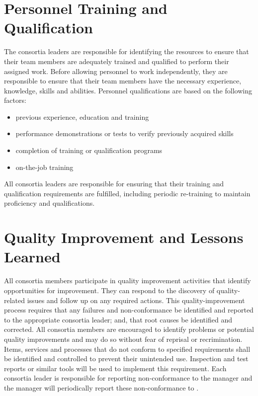 \section{Personnel Training and Qualification}

The  consortia leaders are responsible for identifying the
resources to ensure that their team members are adequately trained and
qualified to perform their assigned work. Before allowing personnel to
work independently, they are responsible to ensure that their team
members have the necessary experience, knowledge, skills and
abilities. Personnel qualifications are based on the following
factors:
\begin{itemize}
 \item previous experience, education and training
 \item performance demonstrations or tests to verify previously
   acquired skills
 \item completion of training or qualification programs
 \item on-the-job training
\end{itemize}

All  consortia leaders are responsible for ensuring that
their training and qualification requirements are fulfilled, including
periodic re-training to maintain proficiency and qualifications.


\section{Quality Improvement and Lessons Learned}
\label{sec:quality_improvement}

All  consortia members participate in quality improvement
activities that identify opportunities for improvement. They can
respond to the discovery of quality-related issues and follow up on
any required actions. This quality-improvement process requires that
any failures and non-conformance be identified and reported to the
appropriate consortia leader; and, that root causes be identified and
corrected. All consortia members are encouraged to identify problems
or potential quality improvements and may do so without fear of
reprisal or recrimination. Items, services and processes that do not
conform to specified requirements shall be identified and controlled
to prevent their unintended use. Inspection and test reports or
similar tools will be used to implement this requirement. Each
consortia leader is responsible for reporting non-conformance to the
  manager and the
  manager will periodically report
these non-conformance to  .

